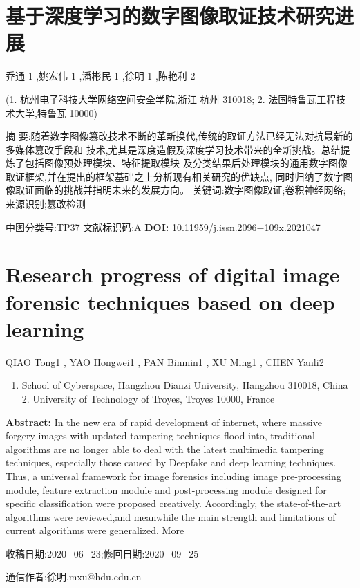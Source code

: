\documentclass{article}
\begin{document}
\section{基于深度学习的数字图像取证技术研究进展}

乔通 1 ,姚宏伟 1 ,潘彬民 1 ,徐明 1 ,陈艳利 2

(1. 杭州电子科技大学网络空间安全学院,浙江 杭州 310018; 2. 法国特鲁瓦工程技术大学,特鲁瓦 10000)

摘 要:随着数字图像篡改技术不断的革新换代,传统的取证方法已经无法对抗最新的多媒体篡改手段和 技术,尤其是深度造假及深度学习技术带来的全新挑战。总结提炼了包括图像预处理模块、特征提取模块 及分类结果后处理模块的通用数字图像取证框架,并在提出的框架基础之上分析现有相关研究的优缺点, 同时归纳了数字图像取证面临的挑战并指明未来的发展方向。 关键词:数字图像取证;卷积神经网络;来源识别;篡改检测

中图分类号:TP37 文献标识码:A \textbf{DOI:} 10.11959/j.issn.2096−109x.2021047

\section{\textbf{Research progress of digital image forensic techniques based on deep learning}}

QIAO Tong1 , YAO Hongwei1 , PAN Binmin1 , XU Ming1 , CHEN Yanli2
\begin{enumerate}
\item 
School of Cyberspace, Hangzhou Dianzi University, Hangzhou 310018, China 2. University of Technology of Troyes, Troyes 10000, France

\end{enumerate}

\textbf{Abstract:} In the new era of rapid development of internet, where massive forgery images with updated tampering techniques flood into, traditional algorithms are no longer able to deal with the latest multimedia tampering techniques, especially those caused by Deepfake and deep learning techniques. Thus, a universal framework for image forensics including image pre-processing module, feature extraction module and post-processing module designed for specific classification were proposed creatively. Accordingly, the state-of-the-art algorithms were reviewed,and meanwhile the main strength and limitations of current algorithms were generalized. More

收稿日期:2020−06−23;修回日期:2020−09−25

通信作者:徐明,mxu@hdu.edu.cn
\end{document}
